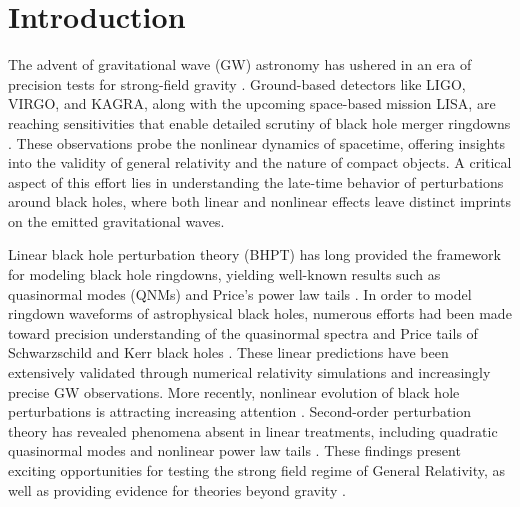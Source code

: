 \documentclass[reprint,aps,physrev,superscriptaddress,10pt,notitlepage,prd,nofootinbib,onecolumn]{revtex4-2}
\begin{document}
\section{Introduction}
\label{sec:introduction}

The advent of gravitational wave (GW) astronomy has ushered in an era of precision tests for strong-field gravity \cite{Berti:2015itd,Berti:2018vdi,Franciolini:2018uyq,LIGOScientific:2020tif}. 
Ground-based detectors like LIGO, VIRGO, and KAGRA, along with the upcoming space-based mission LISA, are reaching sensitivities that enable detailed scrutiny of black hole merger ringdowns \cite{Berti:2005ys,KAGRA:2013rdx,LIGOScientific:2016aoc,KAGRA:2021vkt,LIGOScientific:2023lpe}. %
These observations probe the nonlinear dynamics of spacetime, offering insights into the validity of general relativity and the nature of compact objects. 
A critical aspect of this effort lies in understanding the late-time behavior of perturbations around black holes, where both linear and nonlinear effects leave distinct imprints on the emitted gravitational waves.


Linear black hole perturbation theory (BHPT) has long provided the framework for modeling black hole ringdowns, yielding well-known results such as quasinormal modes (QNMs) and Price’s power law tails \cite{Price:1971fb,Price:1972pw,Leaver:1986gd,Gundlach:1993tp,Gundlach:1993tn,Ching:1995tj,Chandrasekhar:1975zza,Martel:2005ir,Berti:2009kk}.
In order to model ringdown waveforms of astrophysical black holes, numerous efforts had been made toward precision understanding of the quasinormal spectra and Price tails of Schwarzschild and Kerr black holes \cite{Ching:1994bd,Krivan:1996da,Krivan:1997hc,Krivan:1999wh,Burko:2002bt,Burko:2007ju,Hod:2009my,Burko:2010zj,Racz:2011qu,Zenginoglu:2012us,Burko:2013bra,Baibhav:2023clw}.
These linear predictions have been extensively validated through numerical relativity simulations and increasingly precise GW observations.
More recently, nonlinear evolution of black hole perturbations is attracting increasing attention \cite{Sberna:2021eui,Redondo-Yuste:2023seq,Mitman:2022qdl,Cheung:2022rbm,Ioka:2007ak,Redondo-Yuste:2023ipg,Bourg:2024jme,Lagos:2024ekd,Perrone:2023jzq}.
Second-order perturbation theory has revealed phenomena absent in linear treatments, including quadratic quasinormal modes and nonlinear power law tails \cite{Gleiser:1995gx,Gleiser:1998rw,Campanelli:1998jv,Garat:1999vr,Zlochower:2003yh,Brizuela:2006ne,Brizuela:2007zza,Nakano:2007cj,Brizuela:2009qd,Ripley:2020xby,Loutrel:2020wbw,Pazos:2010xf,Khera:2023oyf,Bucciotti:2023ets,Spiers:2023cip,Ma:2024qcv,Zhu:2024rej}.
These findings present exciting opportunities for testing the strong field regime of General Relativity, as well as providing evidence for theories beyond gravity \cite{Berti:2015itd,Berti:2018vdi,Franciolini:2018uyq,LIGOScientific:2020tif,Khera:2024yrk}.
\end{document}
